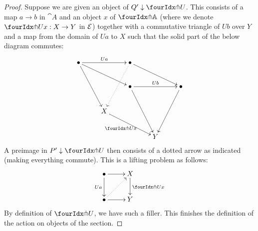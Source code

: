 \documentclass[reqno,10pt,a4paper,oneside]{amsart}
\begin{document}
\begin{proof}
Suppose we are given an object of $Q' \downarrow \liftr{U}$.
This consists of a map $a \to b$ in $\cat{A}$ and an object $x$ of $\liftr{\cat{A}}$ (where we denote $\liftr{U} x : X \to Y$ in $\mathcal{E}$) together with a commutative triangle of $U b$ over $Y$ and a map from the domain of $U a$ to $X$ such that the solid part of the below diagram commutes:
\[
\xymatrix{
  \bullet
  \ar[rr]^{U a}
  \ar[ddr]
  \ar[drr]
&&
  \bullet
  \ar@{.>}[ddl]
  \ar[drr]
\\&&
  \bullet
  \ar[rr]^{U b}
  \ar[ddr]
&&
  \bullet
  \ar[ddl]
\\&
  X
  \ar[drr]_{\liftr{U} x}
\\&&&
  Y
}
\]
A preimage in $P' \downarrow \liftr{U}$ then consists of a dotted arrow as indicated (making everything commute).
This is a lifting problem as follows:
\[
\xymatrix{
  \bullet
  \ar[r]
  \ar[d]_{U a}
&
  X
  \ar[d]^{\liftr{U} x}
\\
  \bullet
  \ar[r]
  \ar@{.>}[ur]
&
  Y
}
\]
By definition of $\liftr{U}$, we have such a filler.
This finishes the definition of the action on objects of the section.


\end{proof}
\end{document}
